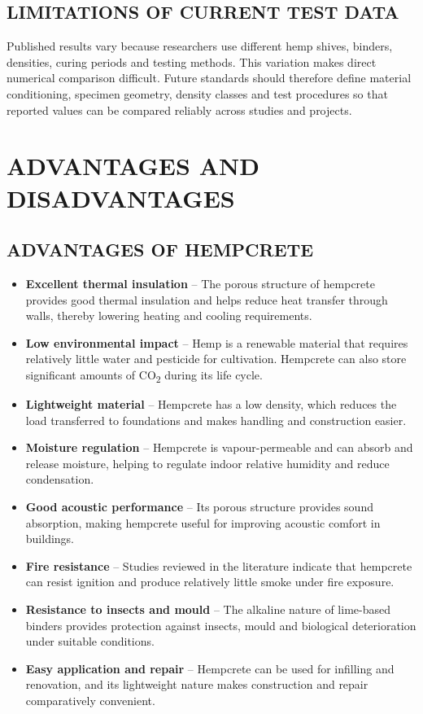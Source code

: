 \documentclass[12pt,a4paper,final]{report}
\begin{document}
\section[Limitations of Current Test Data]{LIMITATIONS OF CURRENT TEST DATA}
Published results vary because researchers use different hemp shives, binders, densities, curing
periods and testing methods. This variation makes direct numerical comparison difficult.
Future standards should therefore define material conditioning, specimen geometry, density
classes and test procedures so that reported values can be compared reliably across studies and
projects.

\chapter{ADVANTAGES AND DISADVANTAGES}

\section[Advantages of Hempcrete]{ADVANTAGES OF HEMPCRETE}
\begin{itemize}[label=\textbullet,leftmargin=2.4em,itemsep=4pt,topsep=3pt,parsep=0pt]
\item \textbf{Excellent thermal insulation} -- The porous structure of hempcrete provides good thermal insulation and helps reduce heat transfer through walls, thereby lowering heating and cooling requirements.
\item \textbf{Low environmental impact} -- Hemp is a renewable material that requires relatively little water and pesticide for cultivation. Hempcrete can also store significant amounts of CO\textsubscript{2} during its life cycle.
\item \textbf{Lightweight material} -- Hempcrete has a low density, which reduces the load transferred to foundations and makes handling and construction easier.
\item \textbf{Moisture regulation} -- Hempcrete is vapour-permeable and can absorb and release moisture, helping to regulate indoor relative humidity and reduce condensation.
\item \textbf{Good acoustic performance} -- Its porous structure provides sound absorption, making hempcrete useful for improving acoustic comfort in buildings.
\item \textbf{Fire resistance} -- Studies reviewed in the literature indicate that hempcrete can resist ignition and produce relatively little smoke under fire exposure.
\item \textbf{Resistance to insects and mould} -- The alkaline nature of lime-based binders provides protection against insects, mould and biological deterioration under suitable conditions.
\item \textbf{Easy application and repair} -- Hempcrete can be used for infilling and renovation, and its lightweight nature makes construction and repair comparatively convenient.
\end{itemize}
\end{document}
